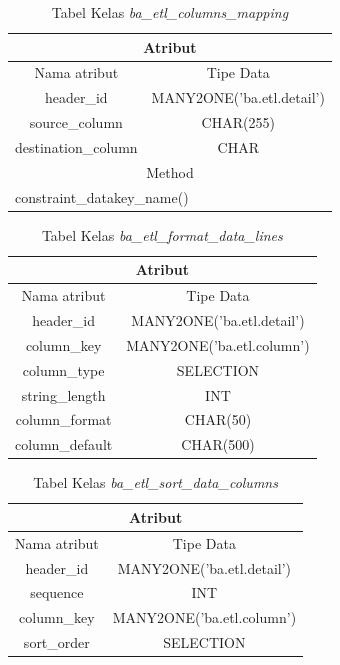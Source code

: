 \begin{table}[H]
	\centering
		\caption{Tabel Kelas \textit{ba\_etl\_columns\_mapping}}
		\begin{tabular}{ | c | c|}
			\hline
				\multicolumn{2}{|c|}{Atribut}\\ \hline 
				Nama atribut & Tipe Data\\ \hline
				header\_id & MANY2ONE('ba.etl.detail')\\ \hline
				source\_column & CHAR(255)\\ \hline
				destination\_column & CHAR\\ \hline
				\multicolumn{2}{|c|}{Method}\\ \hline
				\multicolumn{2}{|l|}{constraint\_datakey\_name()}
		\end{tabular}
\end{table}
	
	\begin{table}[H]
	\centering
		\caption{Tabel Kelas \textit{ba\_etl\_format\_data\_lines}}
		\begin{tabular}{ | c | c|}
			\hline
				\multicolumn{2}{|c|}{Atribut}\\ \hline 
				Nama atribut & Tipe Data\\ \hline
				header\_id & MANY2ONE('ba.etl.detail')\\ \hline
				column\_key & MANY2ONE('ba.etl.column')\\ \hline
				column\_type & SELECTION\\ \hline
				string\_length & INT\\ \hline
				column\_format & CHAR(50)\\ \hline
				column\_default & CHAR(500)\\ \hline
		\end{tabular}
\end{table}

\begin{table}[H]
	\centering
		\caption{Tabel Kelas \textit{ba\_etl\_sort\_data\_columns}}
		\begin{tabular}{ | c | c|}
			\hline
				\multicolumn{2}{|c|}{Atribut}\\ \hline 
				Nama atribut & Tipe Data\\ \hline
				header\_id & MANY2ONE('ba.etl.detail')\\ \hline
				sequence & INT\\ \hline
				column\_key & MANY2ONE('ba.etl.column')\\ \hline
				sort\_order & SELECTION\\ \hline
		\end{tabular}
\end{table}

